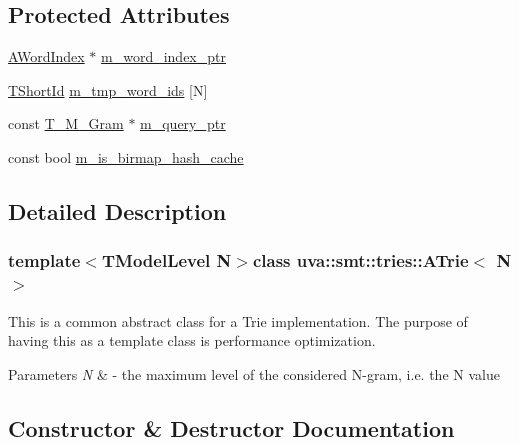 \subsection*{Protected Attributes}
\begin{DoxyCompactItemize}
\item 
\hyperlink{classuva_1_1smt_1_1tries_1_1dictionary_1_1_a_word_index}{A\+Word\+Index} $\ast$ \hyperlink{classuva_1_1smt_1_1tries_1_1_a_trie_abc1f0fe671fcbc898b644715580a6b4a}{m\+\_\+word\+\_\+index\+\_\+ptr}
\item 
\hyperlink{namespaceuva_1_1smt_1_1hashing_adcf22e1982ad09d3a63494c006267469}{T\+Short\+Id} \hyperlink{classuva_1_1smt_1_1tries_1_1_a_trie_a8d2de9b0b513f6910f3e7bfeb24bd6a1}{m\+\_\+tmp\+\_\+word\+\_\+ids} \mbox{[}N\mbox{]}
\item 
const \hyperlink{structuva_1_1smt_1_1tries_1_1mgrams_1_1_t___m___gram}{T\+\_\+\+M\+\_\+\+Gram} $\ast$ \hyperlink{classuva_1_1smt_1_1tries_1_1_a_trie_a737d0794ed253550b080c58381176061}{m\+\_\+query\+\_\+ptr}
\item 
const bool \hyperlink{classuva_1_1smt_1_1tries_1_1_a_trie_ad34967837b387ce38390630fb5c28253}{m\+\_\+is\+\_\+birmap\+\_\+hash\+\_\+cache}
\end{DoxyCompactItemize}


\subsection{Detailed Description}
\subsubsection*{template$<$T\+Model\+Level N$>$class uva\+::smt\+::tries\+::\+A\+Trie$<$ N $>$}

This is a common abstract class for a Trie implementation. The purpose of having this as a template class is performance optimization. 
\begin{DoxyParams}{Parameters}
{\em N} & -\/ the maximum level of the considered N-\/gram, i.\+e. the N value \\
\hline
\end{DoxyParams}


\subsection{Constructor \& Destructor Documentation}
\hypertarget{classuva_1_1smt_1_1tries_1_1_a_trie_adedfb4755e267882e91d9e0db499a1b7}{}
